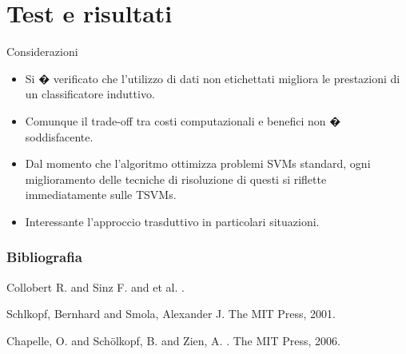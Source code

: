 \documentclass[mathserif]{beamer}
\begin{document}
\section{Test e risultati}


\begin{frame}{Considerazioni}
\begin{block}{}
\begin{itemize}
	\item<1-> Si � verificato che l'utilizzo di dati non etichettati migliora le prestazioni di un classificatore induttivo.
	\item<1-> Comunque il trade-off tra costi computazionali e benefici non � soddisfacente.
	\item<1-> Dal momento che l'algoritmo ottimizza problemi SVMs standard, ogni miglioramento delle tecniche di risoluzione di questi si riflette immediatamente sulle TSVMs.  
	\item<1-> Interessante l'approccio trasduttivo in particolari situazioni.
\end{itemize}
\end{block}
\end{frame}




\begin{frame}
	\frametitle{Bibliografia}
	
		\begin{thebibliography}{}
				\footnotesize
				
			 	Collobert R. and Sinz F. and et al.  
				.
				
				Schlkopf, Bernhard   and Smola, Alexander  J. 
				\newblock The MIT Press, 2001.
				
				Chapelle, O.  and Sch\"{o}lkopf, B.  and Zien, A. 
				.
				\newblock The MIT Press, 2006.


\end{thebibliography}
\end{frame}
\end{document}
